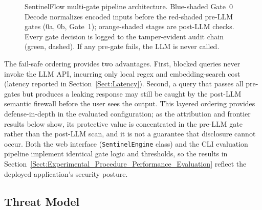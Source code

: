 \documentclass[journal]{IEEEtran}
\begin{document}
\begin{figure}[!ht]
\caption{SentinelFlow multi-gate pipeline architecture. Blue-shaded Gate~0 Decode normalizes encoded inputs before the red-shaded pre-LLM gates (0a, 0b, Gate~1); orange-shaded stages are post-LLM checks. Every gate decision is logged to the tamper-evident audit chain (green, dashed). If any pre-gate fails, the LLM is never called.}
\label{fig:architecture}
\end{figure}

The fail-safe ordering provides two advantages. First, blocked queries never invoke the LLM API, incurring only local regex and embedding-search cost (latency reported in Section~\ref{Sect:Latency}). Second, a query that passes all pre-gates but produces a leaking response may still be caught by the post-LLM semantic firewall before the user sees the output. This layered ordering provides defense-in-depth in the evaluated configuration; as the attribution and frontier results below show, its protective value is concentrated in the pre-LLM gate rather than the post-LLM scan, and it is not a guarantee that disclosure cannot occur. Both the web interface (\texttt{SentinelEngine} class) and the CLI evaluation pipeline implement identical gate logic and thresholds, so the results in Section~\ref{Sect:Experimental_Procedure_Performance_Evaluation} reflect the deployed application's security posture.

\subsection{Threat Model}
\label{Sect:Threat_Model}
\end{document}
